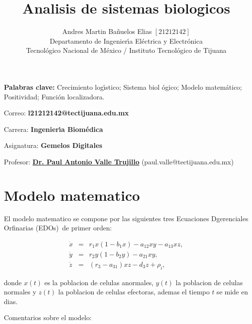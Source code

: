 \documentclass[letterpaper,11pt]{article}
\begin{document}
\title{Analisis de sistemas biologicos}
\author{Andres Martin Ba\~{n}uelos Elias $\left[ 21212142\right] $ \\
Departamento de Ingenier\'{\i}a El\'{e}ctrica y Electr\'{o}nica\\
Tecnol\'{o}gico Nacional de M\'{e}xico / Instituto Tecnol\'{o}gico de Tijuana%
}
\maketitle

\noindent \textbf{Palabras clave: }Crecimiento log\'{\i}stico; Sistema biol%
\'{o}gico; Modelo matem\'{a}tico; Positividad; Funci\'{o}n localizadora.

\noindent Correo: \textbf{l21212142@tectijuana.edu.mx}

\noindent \noindent Carrera: \textbf{Ingenier\'{\i}a Biom\'{e}dica }

\noindent Asignatura: \textbf{Gemelos Digitales}

\noindent Profesor: \href{https://biomath.xyz/}{\textbf{Dr. Paul Antonio
Valle Trujillo}} (paul.valle@tectijuana.edu.mx)

\section{Modelo matematico}

\bigskip El modelo matematico se compone por las siguientes tres Ecuaciones
Dgerenciales Orfinarias (EDOs)\ de primer orden:

\begin{eqnarray*}
\dot{x} &=&r_{1}x(1-b_{1}x)-a_{12}xy-a_{13}xz, \\
\dot{y} &=&r_{2}y(1-b_{2}y)-a_{21}xy, \\
\dot{z} &=&(r_{3}-a_{31})xz-d_{3}z+\rho _{i},
\end{eqnarray*}

donde $x(t)$ es la poblacion de celulas anormales, $y(t)$ la poblacion de
celulas normales y $z(t)$ la poblacion de celulas efectoras, ademas el
tiempo $t$ se mide en dias.

Comentarios sobre el modelo:
\end{document}
